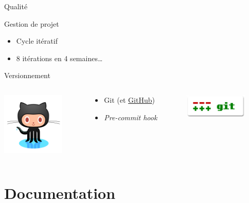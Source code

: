 \documentclass[frenchb]{beamer}
\begin{document}
\begin{frame}{Qualité}
    \begin{block}{Gestion de projet}
        \begin{itemize}
            \item Cycle itératif
            \item 8 itérations en 4 semaines\ldots{}
        \end{itemize}
    \end{block}

    \begin{block}{Versionnement}
        \begin{columns}
            \begin{column}[l]{3cm}
                \begin{center}
                    \includegraphics[width=3cm]{../img/png/octocat.png}
                \end{center}
            \end{column}
            \begin{column}[c]{4cm}
                \begin{itemize}
                    \item Git (et \href{https://github.com/}{GitHub})
                    \item \emph{Pre-commit hook}
                \end{itemize}
            \end{column}
            \begin{column}[r]{3cm}
                \begin{center}
                    \includegraphics[width=3cm]{../img/ps/Git-logo.pdf}
                \end{center}
            \end{column}
        \end{columns}
    \end{block}
\end{frame}

\section{Documentation}
\end{document}

